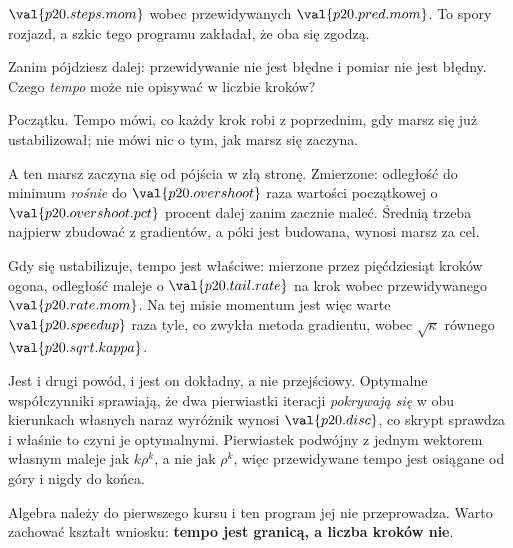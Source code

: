 \begin{fr}
$\val{p20.steps.mom}$ wobec przewidywanych $\val{p20.pred.mom}$. To spory
rozjazd, a szkic tego programu zakładał, że oba się zgodzą.

Zanim pójdziesz dalej: przewidywanie nie jest błędne i pomiar nie jest błędny.
Czego \emph{tempo} może nie opisywać w liczbie kroków?
\dotline
\nextframe
\end{fr}

\begin{fr}
\begin{ansblock}
Początku. Tempo mówi, co każdy krok robi z poprzednim, gdy marsz się już
ustabilizował; nie mówi nic o tym, jak marsz się zaczyna.
\end{ansblock}

A ten marsz zaczyna się od pójścia w złą stronę. Zmierzone: odległość do
minimum \emph{rośnie} do $\val{p20.overshoot}$ raza wartości początkowej
\dash{} o $\val{p20.overshoot.pct}$ procent dalej \dash{} zanim zacznie
maleć. Średnią trzeba najpierw zbudować z gradientów, a póki jest budowana,
wynosi marsz za cel.

Gdy się ustabilizuje, tempo jest właściwe: mierzone przez pięćdziesiąt kroków
ogona, odległość maleje o $\val{p20.tail.rate}$ na krok wobec przewidywanego
$\val{p20.rate.mom}$. Na tej misie momentum jest więc warte
$\val{p20.speedup}$ raza tyle, co zwykła metoda gradientu, wobec
$\sqrt{\kappa}$ równego $\val{p20.sqrt.kappa}$.
\end{fr}

\begin{fr}
\begin{rigourbox}
Jest i drugi powód, i jest on dokładny, a nie przejściowy. Optymalne
współczynniki sprawiają, że dwa pierwiastki iteracji \emph{pokrywają się} w
obu kierunkach własnych naraz \dash{} wyróżnik wynosi $\val{p20.disc}$, co
skrypt sprawdza \dash{} i właśnie to czyni je optymalnymi. Pierwiastek
podwójny z jednym wektorem własnym maleje jak $k\rho^{k}$, a nie jak
$\rho^{k}$, więc przewidywane tempo jest osiągane od góry i nigdy do końca.

Algebra należy do pierwszego kursu i ten program jej nie przeprowadza. Warto
zachować kształt wniosku: \textbf{tempo jest granicą, a liczba kroków nie}.
\end{rigourbox}
\end{fr}

